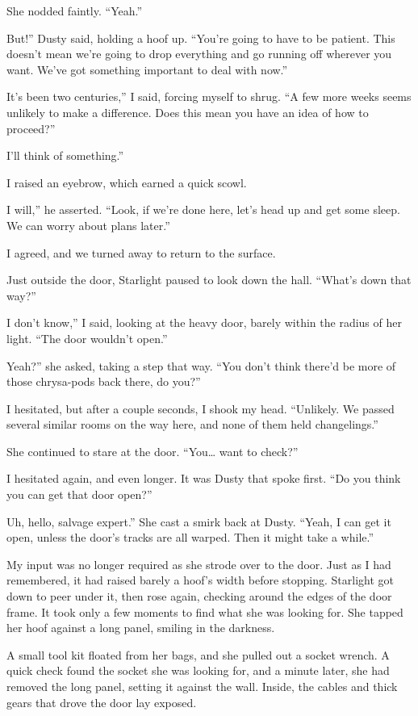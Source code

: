 She nodded faintly. “Yeah.”

\leavevmode{}But!” Dusty said, holding a hoof up. “You’re going to have to be patient. This doesn’t mean we’re going to drop everything and go running off wherever you want. We’ve got something important to deal with now.”

\leavevmode{}It’s been two centuries,” I said, forcing myself to shrug. “A few more weeks seems unlikely to make a difference. Does this mean you have an idea of how to proceed?”

\leavevmode{}I’ll think of something.”

I raised an eyebrow, which earned a quick scowl.

\leavevmode{}I will,” he asserted. “Look, if we’re done here, let’s head up and get some sleep. We can worry about plans later.”

I agreed, and we turned away to return to the surface.

Just outside the door, Starlight paused to look down the hall. “What’s down that way?”

\leavevmode{}I don’t know,” I said, looking at the heavy door, barely within the radius of her light. “The door wouldn’t open.”

\leavevmode{}Yeah?” she asked, taking a step that way. “You don’t think there’d be more of those chrysa-pods back there, do you?”

I hesitated, but after a couple seconds, I shook my head. “Unlikely. We passed several similar rooms on the way here, and none of them held changelings.”

She continued to stare at the door. “You… want to check?”

I hesitated again, and even longer. It was Dusty that spoke first. “Do you think you can get that door open?”

\leavevmode{}Uh, hello, salvage expert.” She cast a smirk back at Dusty. “Yeah, I can get it open, unless the door’s tracks are all warped. Then it might take a while.”

My input was no longer required as she strode over to the door. Just as I had remembered, it had raised barely a hoof’s width before stopping. Starlight got down to peer under it, then rose again, checking around the edges of the door frame. It took only a few moments to find what she was looking for. She tapped her hoof against a long panel, smiling in the darkness.

A small tool kit floated from her bags, and she pulled out a socket wrench. A quick check found the socket she was looking for, and a minute later, she had removed the long panel, setting it against the wall. Inside, the cables and thick gears that drove the door lay exposed.

